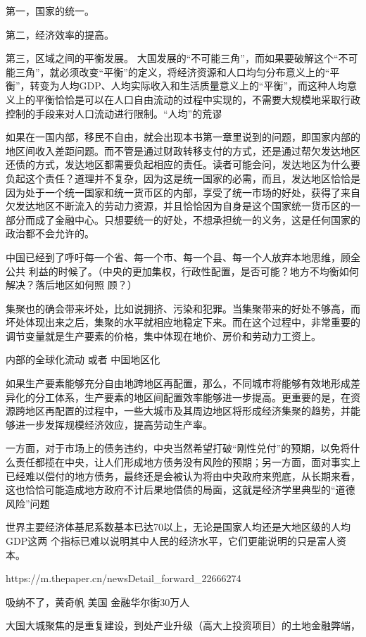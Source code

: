 第一，国家的统一。

第二，经济效率的提高。

第三，区域之间的平衡发展。
大国发展的“不可能三角”，而如果要破解这个“不可能三角”，就必须改变“平衡”的定义，将经济资源和人口均匀分布意义上的“平衡”，转变为人均GDP、人均实际收入和生活质量意义上的“平衡”，而这种人均意义上的平衡恰恰是可以在人口自由流动的过程中实现的，不需要大规模地采取行政控制的手段来对人口流动进行限制。“人均”的荒谬


如果在一国内部，移民不自由，就会出现本书第一章里说到的问题，即国家内部的地区间收入差距问题。而不管是通过财政转移支付的方式，还是通过帮欠发达地区还债的方式，发达地区都需要负起相应的责任。读者可能会问，发达地区为什么要负起这个责任？道理并不复杂，因为这是统一国家的必需，而且，发达地区恰恰是因为处于一个统一国家和统一货币区的内部，享受了统一市场的好处，获得了来自欠发达地区不断流入的劳动力资源，并且恰恰因为自身是这个国家统一货币区的一部分而成了金融中心。只想要统一的好处，不想承担统一的义务，这是任何国家的政治都不会允许的。


中国已经到了呼吁每一个省、每一个市、每一个县、每一个人放弃本地思维，顾全公共
利益的时候了。（中央的更加集权，行政性配置，是否可能？地方不均衡如何解决？落后地区如何照
顾？）

集聚也的确会带来坏处，比如说拥挤、污染和犯罪。当集聚带来的好处不够高，而坏处体现出来之后，集聚的水平就相应地稳定下来。而在这个过程中，非常重要的调节变量就是生产要素的价格，集中体现在地价、房价和劳动力工资上。


内部的全球化流动 或者 中国地区化

如果生产要素能够充分自由地跨地区再配置，那么，不同城市将能够有效地形成差异化的分工体系，生产要素的地区间配置效率能够进一步提高。更重要的是，在资源跨地区再配置的过程中，一些大城市及其周边地区将形成经济集聚的趋势，并能够进一步发挥规模经济效应，提高劳动生产率。

一方面，对于市场上的债务违约，中央当然希望打破“刚性兑付”的预期，以免将什么责任都揽在中央，让人们形成地方债务没有风险的预期；另一方面，面对事实上已经难以偿付的地方债务，最终还是会被认为将由中央政府来兜底，从长期来看，这也恰恰可能造成地方政府不计后果地借债的局面，这就是经济学里典型的“道德风险”问题


世界主要经济体基尼系数基本已达70以上，无论是国家人均还是大地区级的人均GDP这两
个指标已难以说明其中人民的经济水平，它们更能说明的只是富人资本。

https://m.thepaper.cn/newsDetail_forward_22666274

吸纳不了，黄奇帆 美国 金融华尔街30万人

大国大城聚焦的是重复建设，到处产业升级（高大上投资项目）的土地金融弊端，

